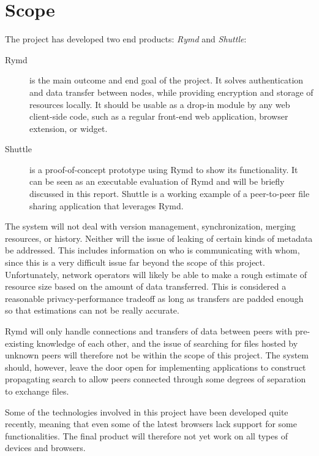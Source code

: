 \section{Scope}

The project has developed two end products: \emph{Rymd} and \emph{Shuttle}:

\begin{description}
\item[Rymd] is the main outcome and end goal of the project. It solves authentication and data transfer between nodes, while providing encryption and storage of resources locally. It should be usable as a drop-in module by any web client-side code, such as a regular front-end web application, browser extension, or widget.

\item[Shuttle] is a proof-of-concept prototype using Rymd to show its functionality. It can be seen as an executable evaluation of Rymd and will be briefly discussed in this report. Shuttle is a working example of a peer-to-peer file sharing application that leverages Rymd.
\end{description}

The system will not deal with version management, synchronization, merging resources, or history. Neither will the issue of leaking of certain kinds of metadata be addressed. This includes information on who is communicating with whom, since this is a very difficult issue far beyond the scope of this project. Unfortunately, network operators will likely be able to make a rough estimate of resource size based on the amount of data transferred. This is considered a reasonable privacy-performance tradeoff as long as transfers are padded enough so that estimations can not be really accurate.

Rymd will only handle connections and transfers of data between peers with pre-existing knowledge of each other, and the issue of searching for files hosted by unknown peers will therefore not be within the scope of this project. The system should, however, leave the door open for implementing applications to construct propagating search to allow peers connected through some degrees of separation to exchange files.

Some of the technologies involved in this project have been developed quite recently, meaning that even some of the latest browsers lack support for some functionalities. The final product will therefore not yet work on all types of devices and browsers.

